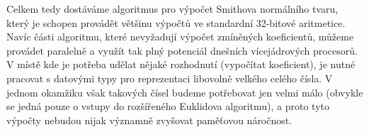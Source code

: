 Celkem tedy dostáváme algoritmus pro výpočet Smithova normálního tvaru, který
je schopen provádět většinu výpočtů ve standardní 32-bitové aritmetice. Navíc části
algoritmu, které nevyžadují výpočet zmíněných koeficientů, můžeme provádet
paralelně a využít tak plný potenciál dnešních vícejádrových procesorů.
V místě kde je potřeba udělat nějaké rozhodnutí (vypočítat koeficient),
je nutné pracovat s datovými typy pro reprezentaci libovolně velkého celého
čísla. V jednom okamžiku však takových čísel budeme potřebovat jen velmi málo
(obvykle se jedná pouze o vstupy do rozšířeného Euklidova algoritmu), a proto
tyto výpočty nebudou nijak významně zvyšovat paměťovou náročnost.
